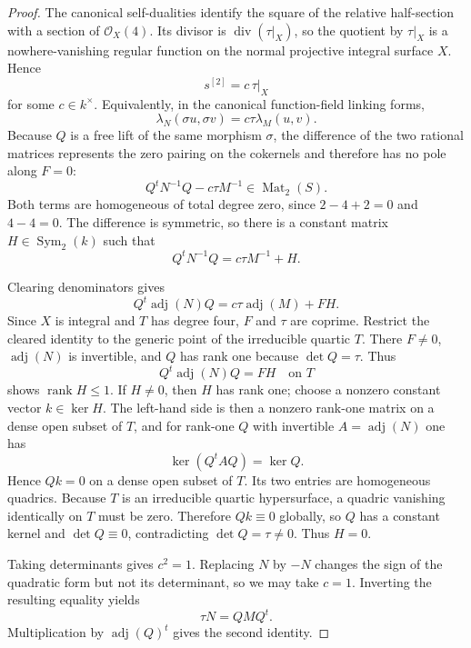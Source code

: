 \documentclass[11pt,reqno]{amsart}
\theoremstyle{remark}
\newcommand{\cO}{\mathcal O}
\newcommand{\adj}{\operatorname{adj}}
\newcommand{\Sym}{\operatorname{Sym}}
\newcommand{\rank}{\operatorname{rank}}
\newcommand{\divi}{\operatorname{div}}
\begin{document}
\begin{proof}
The canonical self-dualities identify the square of the relative half-section with a section of $\cO_X(4)$.  Its divisor is $\divi(\tau|_X)$, so the quotient by $\tau|_X$ is a nowhere-vanishing regular function on the normal projective integral surface $X$.  Hence
\[
s^{[2]}=c\,\tau|_X
\]
for some $c\in k^\times$.  Equivalently, in the canonical function-field linking forms,
\[
\lambda_N(\sigma u,\sigma v)=c\tau\lambda_M(u,v).
\]
Because $Q$ is a free lift of the same morphism $\sigma$, the difference of the two rational matrices represents the zero pairing on the cokernels and therefore has no pole along $F=0$:
\[
Q^tN^{-1}Q-c\tau M^{-1}\in\operatorname{Mat}_2(S).
\]
Both terms are homogeneous of total degree zero, since $2-4+2=0$ and $4-4=0$.  The difference is symmetric, so there is a constant matrix $H\in\Sym_2(k)$ such that
\[
Q^tN^{-1}Q=c\tau M^{-1}+H.
\]

Clearing denominators gives
\[
Q^t\adj(N)Q=c\tau\adj(M)+FH.
\]
Since $X$ is integral and $T$ has degree four, $F$ and $\tau$ are coprime.  Restrict the cleared identity to the generic point of the irreducible quartic $T$.  There $F\ne0$, $\adj(N)$ is invertible, and $Q$ has rank one because $\det Q=\tau$.  Thus
\[
Q^t\adj(N)Q=FH
\quad\text{on }T
\]
shows $\rank H\le1$.  If $H\ne0$, then $H$ has rank one; choose a nonzero constant vector $k\in\ker H$.  The left-hand side is then a nonzero rank-one matrix on a dense open subset of $T$, and for rank-one $Q$ with invertible $A=\adj(N)$ one has
\[
\ker(Q^tAQ)=\ker Q.
\]
Hence $Qk=0$ on a dense open subset of $T$.  Its two entries are homogeneous quadrics.  Because $T$ is an irreducible quartic hypersurface, a quadric vanishing identically on $T$ must be zero.  Therefore $Qk\equiv0$ globally, so $Q$ has a constant kernel and $\det Q\equiv0$, contradicting $\det Q=\tau\ne0$.  Thus $H=0$.

Taking determinants gives $c^2=1$.  Replacing $N$ by $-N$ changes the sign of the quadratic form but not its determinant, so we may take $c=1$.  Inverting the resulting equality yields
\[
\tau N=QMQ^t.
\]
Multiplication by $\adj(Q)^t$ gives the second identity.
\end{proof}
\end{document}
